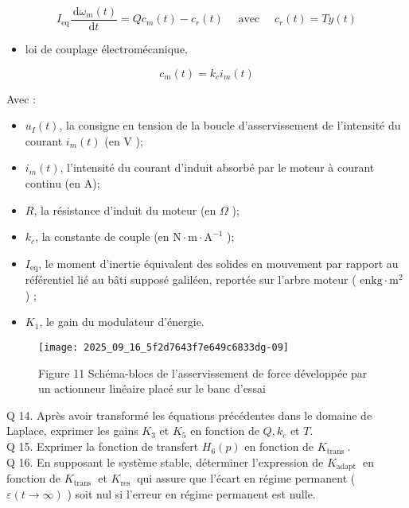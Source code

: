 $$
I_{\mathrm{eq}} \frac{\mathrm{~d} \omega_{m}(t)}{\mathrm{d} t}=Q c_{m}(t)-c_{r}(t) \quad \text { avec } \quad c_{r}(t)=T y(t)
$$

\begin{itemize}
  \item loi de couplage électromécanique,
\end{itemize}

$$
c_{m}(t)=k_{c} i_{m}(t)
$$

Avec :

\begin{itemize}
  \item $u_{I}(t)$, la consigne en tension de la boucle d'asservissement de l'intensité du courant $i_{m}(t)$ (en V );
  \item $i_{m}(t)$, l'intensité du courant d'induit absorbé par le moteur à courant continu (en A);
  \item $R$, la résistance d'induit du moteur (en $\Omega$ );
  \item $k_{c}$, la constante de couple (en $\mathrm{N} \cdot \mathrm{m} \cdot \mathrm{A}^{-1}$ );
  \item $I_{\mathrm{eq}}$, le moment d'inertie équivalent des solides en mouvement par rapport au référentiel lié au bâti supposé galiléen, reportée sur l'arbre moteur ( $\mathrm{en} \mathrm{kg} \cdot \mathrm{m}^{2}$ ) ;
  \item $K_{1}$, le gain du modulateur d'énergie.
\end{itemize}

\begin{figure}[h]
\begin{center}
  \texttt{[image: 2025\_09\_16\_5f2d7643f7e649c6833dg-09]}
\captionsetup{labelformat=empty}
\caption{Figure 11 Schéma-blocs de l'asservissement de force développée par un actionneur linéaire placé sur le banc d'essai}
\end{center}
\end{figure}

Q 14. Après avoir transformé les équations précédentes dans le domaine de Laplace, exprimer les gains $K_{3}$ et $K_{5}$ en fonction de $Q, k_{c}$ et $T$.\\
Q 15. Exprimer la fonction de transfert $H_{6}(p)$ en fonction de $K_{\text {trans }}$.\\
Q 16. En supposant le système stable, déterminer l'expression de $K_{\text {adapt }}$ en fonction de $K_{\text {trans }}$ et $K_{\text {res }}$ qui assure que l'écart en régime permanent ( $\varepsilon(t \rightarrow \infty)$ ) soit nul si l'erreur en régime permanent est nulle.

